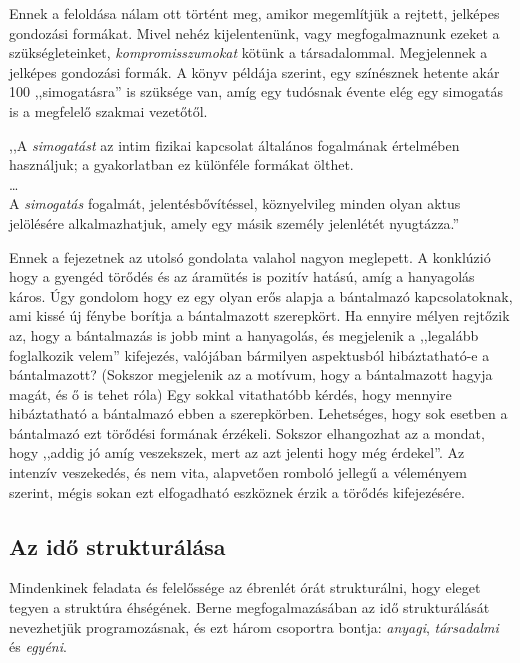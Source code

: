 \documentclass[a4paper,12pt]{article}
\begin{document}
	Ennek a feloldása nálam ott történt meg, amikor megemlítjük a rejtett, jelképes gondozási formákat. Mivel nehéz kijelentenünk, vagy megfogalmaznunk ezeket a szükségleteinket, \textit{kompromisszumokat} kötünk a társadalommal. Megjelennek a jelképes gondozási formák. A könyv példája szerint, egy színésznek hetente akár 100 ,,simogatásra'' is szüksége van, amíg egy tudósnak évente elég egy simogatás is a megfelelő szakmai vezetőtől.
	
	\begin{flushright}
		{\footnotesize 		,,A \textit{simogatást} az intim fizikai kapcsolat általános fogalmának értelmében használjuk; a gyakorlatban ez különféle formákat  ölthet.\\ \dots \\ 
		A \textit{simogatás}  fogalmát, jelentésbővítéssel, köznyelvileg minden olyan aktus jelölésére alkalmazhatjuk, amely egy másik személy jelenlétét nyugtázza.''}
	\end{flushright}

	Ennek a fejezetnek az utolsó gondolata valahol nagyon meglepett. A konklúzió hogy a gyengéd törődés és az áramütés is pozitív hatású, amíg a hanyagolás káros.
	Úgy gondolom hogy ez egy olyan erős alapja a bántalmazó kapcsolatoknak, ami kissé új fénybe borítja a bántalmazott szerepkört. Ha ennyire mélyen rejtőzik az, hogy a bántalmazás is jobb mint a hanyagolás, és megjelenik a ,,legalább foglalkozik velem'' kifejezés, valójában bármilyen aspektusból hibáztatható-e a bántalmazott? (Sokszor megjelenik az a motívum, hogy a bántalmazott hagyja magát, és ő is tehet róla) Egy sokkal vitathatóbb kérdés, hogy mennyire hibáztatható a bántalmazó ebben a szerepkörben. Lehetséges, hogy sok esetben a bántalmazó ezt törődési formának érzékeli. Sokszor elhangozhat az a mondat, hogy ,,addig jó amíg veszekszek, mert az azt jelenti hogy még érdekel''. Az intenzív veszekedés, és nem vita, alapvetően romboló jellegű a véleményem szerint, mégis sokan ezt elfogadható eszköznek érzik a törődés kifejezésére. 
	

	\subsection{Az idő strukturálása}
	Mindenkinek feladata és felelőssége az ébrenlét órát strukturálni, hogy eleget tegyen a struktúra éhségének. Berne megfogalmazásában az idő strukturálását nevezhetjük programozásnak, és ezt három csoportra bontja: \textit{anyagi}, \textit{társadalmi} és \textit{egyéni}.
	
\end{document}
